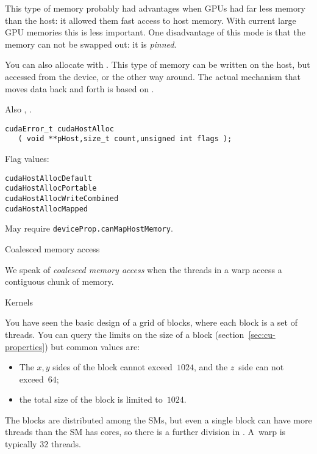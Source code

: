 This type of memory probably had advantages when \acp{GPU} had far less memory
than the host: it allowed them fast access to host memory.
With current large GPU memories this is less important.
One disadvantage of this mode is that the memory can not be swapped out:
it is \emph{pinned}.

You can also allocate  with .
This type of memory can be written on the host,
but accessed from the device, or the other way around.
The actual mechanism that moves data back and forth
is based on .

Also , .
\begin{lstlisting}
cudaError_t cudaHostAlloc
   ( void **pHost,size_t count,unsigned int flags );
\end{lstlisting}
Flag values:
\begin{lstlisting}
cudaHostAllocDefault
cudaHostAllocPortable
cudaHostAllocWriteCombined
cudaHostAllocMapped
\end{lstlisting}


May require \lstinline{deviceProp.canMapHostMemory}.

 {Coalesced memory access}

We speak of
\emph{coalesced memory access}
when the threads in a warp access a contiguous chunk of memory.

 {Kernels}

You have seen the basic design of a grid of blocks,
where each block is a set of threads.
You can query the limits on the size of a block
(section~\ref{sec:cu-properties})
but common values are:
\begin{itemize}
\item
  The $x,y$ sides of the block cannot exceed~$1024$, and the $z$~side
  can not exceed~$64$;
\item the total size of the block is limited to~$1024$.
\end{itemize}

The blocks are distributed among the \acp{SM},
but even a single block can have more threads than
the \ac{SM} has cores, so
there is a further division in .
A~warp is typically 32 threads.

